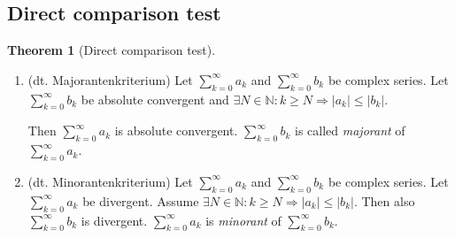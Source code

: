 \documentclass[a4paper,landscape,twocolumn]{article}
\theoremstyle{definition}
\newtheorem{theorem}{Theorem}
\newcommand\abs[1]{\left|#1\right|}
\begin{document}
\subsection{Direct comparison test}
\begin{theorem}[Direct comparison test] \hfill{}
  \begin{enumerate}
    \item
      (dt. \foreignlanguage{ngerman}{Majorantenkriterium})
      Let $\sum_{k=0}^\infty a_k$ and $\sum_{k=0}^\infty b_k$ be complex series.
      Let $\sum_{k=0}^\infty b_k$ be absolute convergent and $\exists N \in \mathbb N: k \geq N
      \Rightarrow \abs{a_k} \leq \abs{b_k}$.

      Then $\sum_{k=0}^\infty a_k$ is absolute convergent.
      $\sum_{k=0}^\infty b_k$ is called \emph{majorant} of $\sum_{k=0}^\infty a_k$.

    \item
      (dt. \foreignlanguage{ngerman}{Minorantenkriterium})
      Let $\sum_{k=0}^\infty a_k$ and $\sum_{k=0}^\infty b_k$ be complex series.
      Let $\sum_{k=0}^\infty a_k$ be divergent.
      Assume $\exists N \in \mathbb N: k \geq N \Rightarrow \abs{a_k} \leq \abs{b_k}$.
      Then also $\sum_{k=0}^\infty b_k$ is divergent.
      $\sum_{k=0}^\infty a_k$ is \emph{minorant} of $\sum_{k=0}^\infty b_k$.
  \end{enumerate}
\end{theorem}
\end{document}
